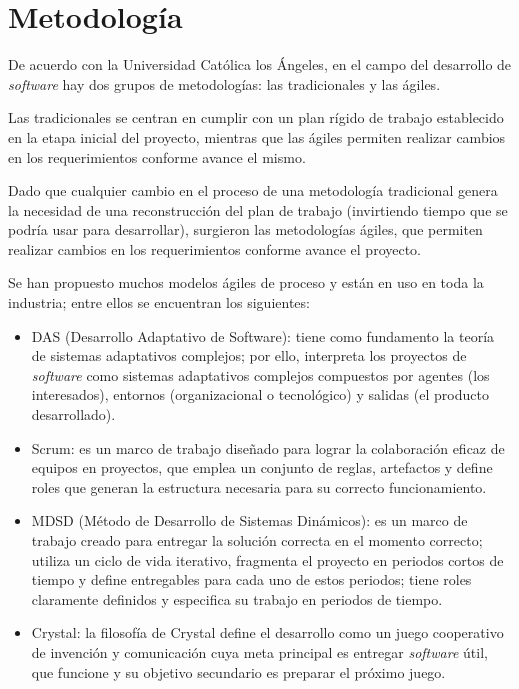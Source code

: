 
\section{Metodología}
De acuerdo con la Universidad Católica los Ángeles\cite{angeles_metodologidesarrollo_2020}, en el campo del desarrollo de \textit{software} hay dos grupos de metodologías: las tradicionales y las ágiles.


Las tradicionales se centran en cumplir con un plan rígido de trabajo establecido en la etapa inicial del proyecto, mientras que las ágiles permiten realizar cambios en los requerimientos conforme avance el mismo.


Dado que cualquier cambio en el proceso de una metodología tradicional genera la necesidad de una reconstrucción del plan de trabajo (invirtiendo tiempo que se podría usar para desarrollar), surgieron las metodologías ágiles, que permiten realizar cambios en los requerimientos conforme avance el proyecto.


Se han propuesto muchos modelos ágiles de proceso y están en uso en toda la industria; entre ellos se encuentran los siguientes:


\begin{itemize}
	\item DAS (Desarrollo Adaptativo de Software): tiene como fundamento la teoría de sistemas adaptativos complejos; por ello, interpreta los proyectos de \textit{software} como sistemas adaptativos complejos compuestos
    por agentes (los interesados), entornos (organizacional o tecnológico) y salidas (el producto desarrollado)\cite{cadavid_revision_2013}.
	\item Scrum: es un marco de trabajo diseñado para lograr la colaboración eficaz de equipos en proyectos, que emplea un conjunto de reglas, artefactos y define roles que generan la estructura necesaria para su correcto funcionamiento\cite{cadavid_revision_2013}.
	\item MDSD (Método de Desarrollo de Sistemas Dinámicos): es un marco de trabajo creado para entregar la solución correcta en el momento correcto; utiliza un ciclo de vida iterativo, fragmenta el proyecto en periodos cortos de tiempo y define entregables para cada uno de estos periodos; tiene roles claramente definidos y especifica su trabajo en periodos de tiempo\cite{cadavid_revision_2013}.
	\item Crystal: la filosofía de Crystal define el desarrollo como un juego cooperativo de invención y comunicación cuya meta principal es entregar \textit{software} útil, que funcione y su objetivo secundario es preparar el próximo juego\cite{cadavid_revision_2013}.
\end{itemize}

